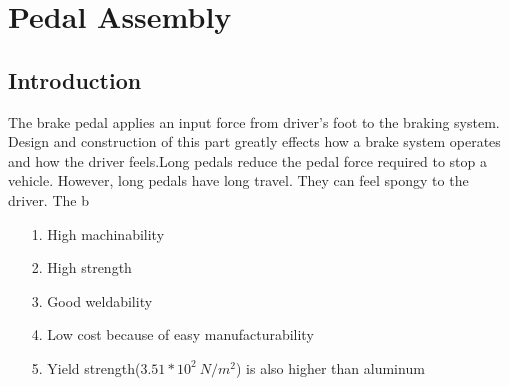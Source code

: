 \chapter{Pedal Assembly}

\section{Introduction}
The brake pedal applies an input force from driver's foot to the braking system. Design and construction of this part greatly effects how a brake system operates and how the driver feels.Long pedals reduce the pedal force required to stop a vehicle. However, long pedals have long travel. They can feel spongy to the driver. The b
\begin{enumerate}
\item[1.] High machinability
\item[2.] High strength
\item[3.] Good weldability
\item[4.] Low cost because of easy manufacturability
\item[5.] Yield strength($3.51*10^2 \ N/m^2$) is also higher than aluminum
\end{enumerate}
